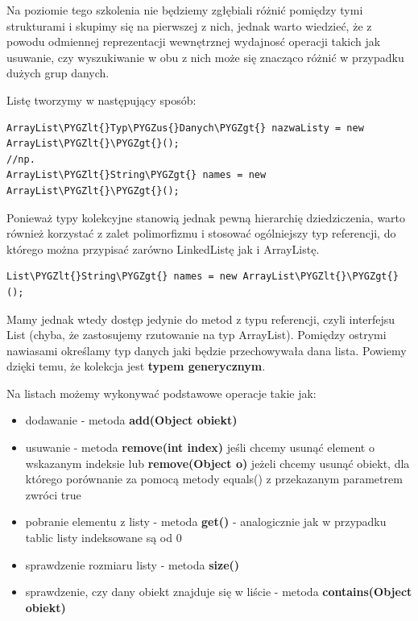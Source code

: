 \documentclass[letterpaper,10pt,english]{sphinxmanual}
\def\PYGZus{\char`\_}
\def\PYGZlt{\char`\<}
\def\PYGZgt{\char`\>}
\begin{document}
Na poziomie tego szkolenia nie będziemy zgłębiali różnić pomiędzy tymi strukturami i skupimy się na pierwszej z nich, jednak warto wiedzieć, że z powodu odmiennej reprezentacji wewnętrznej wydajnosć operacji takich jak usuwanie, czy wyszukiwanie w obu z nich może się znacząco różnić w przypadku dużych grup danych.

Listę tworzymy w następujący sposób:

\begin{Verbatim}[commandchars=\\\{\}]
ArrayList\PYGZlt{}Typ\PYGZus{}Danych\PYGZgt{} nazwaListy = new ArrayList\PYGZlt{}\PYGZgt{}();
//np.
ArrayList\PYGZlt{}String\PYGZgt{} names = new ArrayList\PYGZlt{}\PYGZgt{}();
\end{Verbatim}

Ponieważ typy kolekcyjne stanowią jednak pewną hierarchię dziedziczenia, warto również korzystać z zalet polimorfizmu i stosować ogólniejszy typ referencji, do którego można przypisać zarówno LinkedListę jak i ArrayListę.

\begin{Verbatim}[commandchars=\\\{\}]
List\PYGZlt{}String\PYGZgt{} names = new ArrayList\PYGZlt{}\PYGZgt{}();
\end{Verbatim}

Mamy jednak wtedy dostęp jedynie do metod z typu referencji, czyli interfejsu List (chyba, że zastosujemy rzutowanie na typ ArrayList).
Pomiędzy ostrymi nawiasami określamy typ danych jaki będzie przechowywała dana lista. Powiemy dzięki temu, że kolekcja jest \textbf{typem generycznym}.

Na listach możemy wykonywać podstawowe operacje takie jak:
\begin{itemize}
\item {} 
dodawanie - metoda \textbf{add(Object obiekt)}

\item {} 
usuwanie - metoda \textbf{remove(int index)} jeśli chcemy usunąć element o wskazanym indeksie lub \textbf{remove(Object o)} jeżeli chcemy usunąć obiekt, dla którego porównanie za pomocą metody equals() z przekazanym parametrem zwróci true

\item {} 
pobranie elementu z listy - metoda \textbf{get()} - analogicznie jak w przypadku tablic listy indeksowane są od 0

\item {} 
sprawdzenie rozmiaru listy - metoda \textbf{size()}

\item {} 
sprawdzenie, czy dany obiekt znajduje się w liście - metoda \textbf{contains(Object obiekt)}

\end{itemize}
\end{document}
